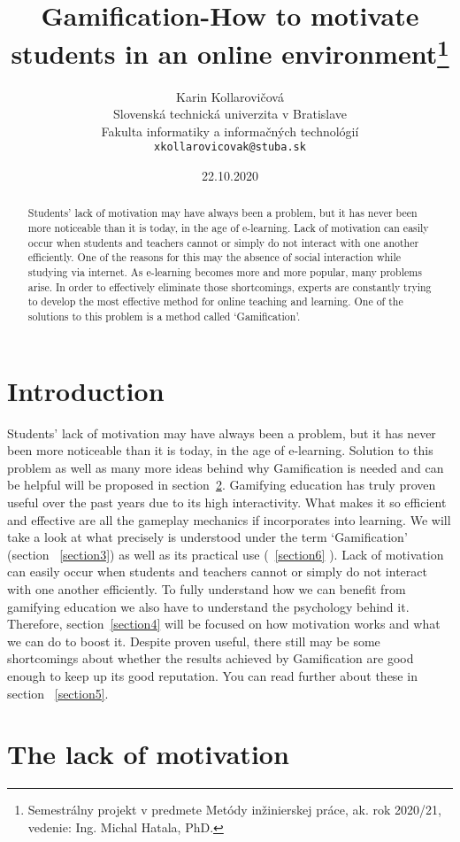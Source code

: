 \documentclass[10pt,twoside,english,a4paper]{article}
\title{Gamification-How to motivate students in an online environment\thanks{Semestrálny projekt v predmete Metódy inžinierskej práce, ak. rok 2020/21, vedenie: Ing. Michal Hatala, PhD.}}
\author{Karin Kollarovičová\\[2pt]
	{\small Slovenská technická univerzita v Bratislave}\\
	{\small Fakulta informatiky a informačných technológií}\\
	{\small \texttt{xkollarovicovak@stuba.sk}}
	}
\date{\small 22.10.2020}
\begin{document}
\maketitle

\begin{abstract}
	Students’ lack of motivation may have always been a problem, but it has never been more noticeable than it is today, in the age of e-learning. Lack of motivation can easily occur when students and teachers cannot or simply do not interact with one another efficiently. One of the reasons for this may the absence of social interaction while studying via internet. As e-learning becomes more and more popular, many problems arise. In order to effectively eliminate those shortcomings, experts are constantly trying to develop the most effective method for online teaching and learning. One of the solutions to this problem is a method called ‘Gamification’. 	
\end{abstract}



\section{Introduction}
Students’ lack of motivation may have always been a problem, but it has never been more noticeable than it is today, in the age of e-learning. 
Solution to this problem as well as many more ideas behind why Gamification is needed and can be helpful will be proposed in section~\ref{section2}. 
Gamifying education has truly proven useful over the past years due to its high interactivity. What makes it so efficient and effective are all the gameplay mechanics if incorporates into learning.
We will take a look at what precisely is understood under the term ‘Gamification’ (section ~\ref{section3}) as well as its practical use (~\ref{section6} ).
Lack of motivation can easily occur when students and teachers cannot or simply do not interact with one another efficiently. To fully understand how we can benefit from gamifying education we also have to understand the psychology behind it.
Therefore, section~\ref{section4} will be focused on how motivation works and what we can do to boost it. Despite proven useful, there still may be some shortcomings about whether the results achieved by Gamification are good enough to keep up its good reputation. You can read further about these in section ~\ref{section5}.

\section{The lack of motivation} \label{section2}
\end{document}
